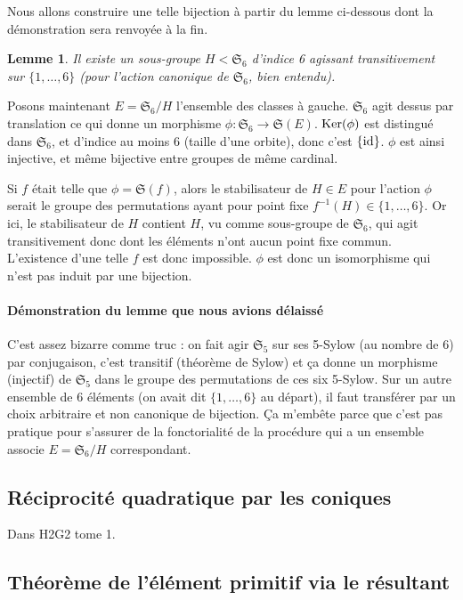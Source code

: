 \documentclass[a4paper, 11pt]{article}
\def\Sigmap{\mathfrak{S}}
\def\Ker{\textnormal{Ker}}
\newtheorem*{lemma}{Lemme}
\begin{document}
Nous allons construire une telle bijection à partir du lemme ci-dessous dont la
démonstration sera renvoyée à la fin.

\begin{lemma}
  Il existe un sous-groupe $H < \Sigmap_6$ d'indice 6 agissant transitivement
  sur $\{1,\ldots,6\}$ (pour l'action canonique de $\Sigmap_6$, bien entendu).
\end{lemma}

Posons maintenant $E = \Sigmap_6/H$ l'ensemble des classes à gauche. $\Sigmap_6$
agit dessus par translation ce qui donne un morphisme $\phi : \Sigmap_6 \to
\Sigmap(E)$. $\Ker(\phi)$ est distingué dans $\Sigmap_6$, et d'indice au moins 6
(taille d'une orbite), donc c'est $\{\textnormal{id}\}$. $\phi$ est ainsi
injective, et même bijective entre groupes de même cardinal.

Si $f$ était telle que $\phi = \Sigmap(f)$, alors le stabilisateur de $H \in E$
pour l'action $\phi$ serait le groupe des permutations ayant pour point fixe
$f^{-1}(H) \in \{1,\ldots,6\}$. Or ici, le stabilisateur de $H$ contient $H$, vu
comme sous-groupe de $\Sigmap_6$, qui agit transitivement donc dont les éléments
n'ont aucun point fixe commun. L'existence d'une telle $f$ est donc impossible.
$\phi$ est donc un isomorphisme qui n'est pas induit par une bijection.

\paragraph{Démonstration du lemme que nous avions délaissé} C'est assez bizarre
comme truc : on fait agir $\Sigmap_5$ sur ses 5-Sylow (au nombre de 6) par
conjugaison, c'est transitif (théorème de Sylow) et ça donne un morphisme
(injectif) de $\Sigmap_5$ dans le groupe des permutations de ces six 5-Sylow.
Sur un autre ensemble de 6 éléments (on avait dit $\{1,\ldots,6\}$ au départ),
il faut transférer par un choix arbitraire et non canonique de bijection. Ça
m'embête parce que c'est pas pratique pour s'assurer de la fonctorialité de la
procédure qui a un ensemble associe $E = \Sigmap_6/H$ correspondant.


\subsection{Réciprocité quadratique par les coniques}

Dans H2G2 tome 1.

\subsection{Théorème de l'élément primitif via le résultant}
\end{document}
